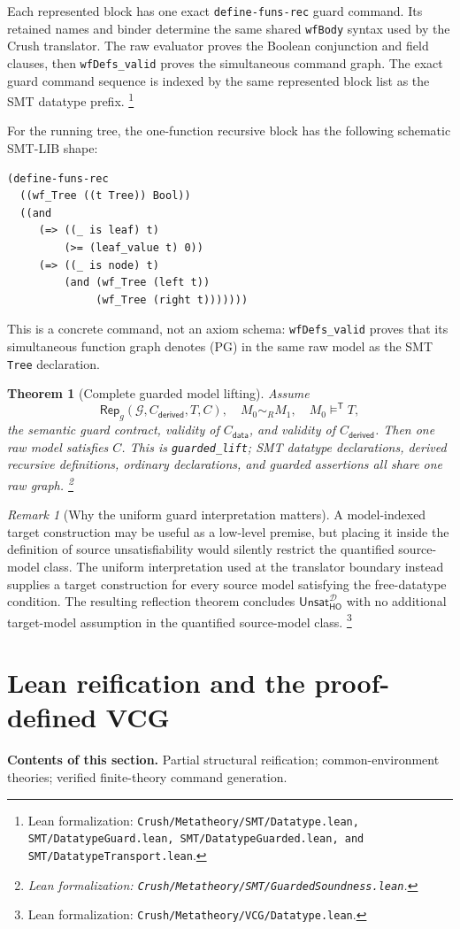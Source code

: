 \documentclass[11pt]{article}
\newtheorem{theorem}[definition]{Theorem}
\theoremstyle{remark}
\newtheorem{remark}[definition]{Remark}
\newcommand{\leanfile}[1]{\footnote{Lean formalization: \texttt{Crush/Metatheory/#1}.}}
\newcommand{\leanfiles}[1]{\footnote{Lean formalization: \texttt{Crush/Metatheory/#1}.}}
\newcommand{\sectioncontents}[1]{%
  \smallskip\noindent\textbf{Contents of this section.} #1\par\medskip}
\newcommand{\satt}{\models^{\mathsf T}}
\newcommand{\unsat}{\mathsf{Unsat}}
\newcommand{\Rep}{\mathsf{Rep}}
\begin{document}
Each represented block has one exact \texttt{define-funs-rec} guard command.
Its retained names and binder determine the same shared \texttt{wfBody} syntax
used by the Crush translator. The raw evaluator proves the Boolean conjunction and field
clauses, then \texttt{wfDefs\_valid} proves the simultaneous command graph.
The exact guard command sequence is indexed by the same represented block list as
the SMT datatype prefix.
\leanfiles{SMT/Datatype.lean, SMT/DatatypeGuard.lean, SMT/DatatypeGuarded.lean, and SMT/DatatypeTransport.lean}

For the running tree, the one-function recursive block has the following
schematic SMT-LIB shape:
\begin{verbatim}
(define-funs-rec
  ((wf_Tree ((t Tree)) Bool))
  ((and
     (=> ((_ is leaf) t)
         (>= (leaf_value t) 0))
     (=> ((_ is node) t)
         (and (wf_Tree (left t))
              (wf_Tree (right t)))))))
\end{verbatim}
This is a concrete command, not an axiom schema: \texttt{wfDefs\_valid} proves
that its simultaneous function graph denotes (PG) in the same raw model as the
SMT \texttt{Tree} declaration.

\begin{theorem}[Complete guarded model lifting]
Assume
\[
 \Rep_g(\mathcal G,C_{\mathsf{derived}},T,C),\quad
 M_0\sim_R M_1,\quad M_0\satt T,
\]
the semantic guard contract, validity of $C_{\mathsf{data}}$, and validity of
$C_{\mathsf{derived}}$. Then one raw model satisfies $C$. This is
\texttt{guarded\_lift}; SMT datatype declarations, derived recursive definitions,
ordinary declarations, and guarded assertions all share one raw graph.
\leanfile{SMT/GuardedSoundness.lean}
\end{theorem}

\begin{remark}[Why the uniform guard interpretation matters]
A model-indexed target construction may be useful as a low-level premise, but
placing it inside the definition of source unsatisfiability would silently
restrict the quantified source-model class. The uniform interpretation used at
the translator boundary instead supplies a target construction for every source
model satisfying the free-datatype condition. The resulting reflection theorem
concludes $\unsat_{\mathsf{HO}}^{\mathcal D}$ with no additional target-model
assumption in the quantified source-model class.
\leanfile{VCG/Datatype.lean}
\end{remark}

\section{Lean reification and the proof-defined VCG}
\sectioncontents{Partial structural reification; common-environment theories; verified finite-theory command generation.}
\end{document}
